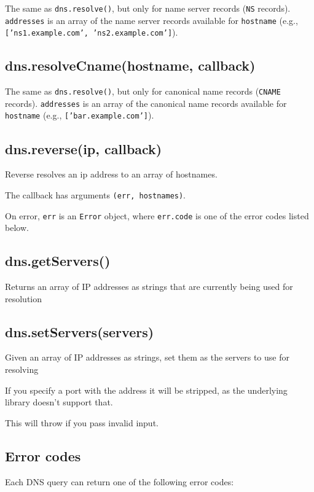 The same as \texttt{dns.resolve()}, but only for name server records
(\texttt{NS} records). \texttt{addresses} is an array of the name server
records available for \texttt{hostname} (e.g.,
\texttt{{[}'ns1.example.com', 'ns2.example.com'{]}}).

\subsection{dns.resolveCname(hostname, callback)}

The same as \texttt{dns.resolve()}, but only for canonical name records
(\texttt{CNAME} records). \texttt{addresses} is an array of the
canonical name records available for \texttt{hostname} (e.g.,
\texttt{{[}'bar.example.com'{]}}).

\subsection{dns.reverse(ip, callback)}

Reverse resolves an ip address to an array of hostnames.

The callback has arguments \texttt{(err, hostnames)}.

On error, \texttt{err} is an \texttt{Error} object, where
\texttt{err.code} is one of the error codes listed below.

\subsection{dns.getServers()}

Returns an array of IP addresses as strings that are currently being
used for resolution

\subsection{dns.setServers(servers)}

Given an array of IP addresses as strings, set them as the servers to
use for resolving

If you specify a port with the address it will be stripped, as the
underlying library doesn't support that.

This will throw if you pass invalid input.

\subsection{Error codes}

Each DNS query can return one of the following error codes:

